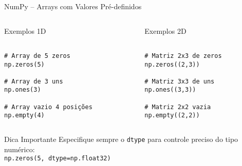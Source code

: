 \begin{frame}[fragile]{NumPy – Arrays com Valores Pré-definidos}
\begin{columns}[T]
    \begin{column}{0.5\textwidth}
        \begin{exampleblock}{Exemplos 1D}
\begin{verbatim}

# Array de 5 zeros
np.zeros(5)

# Array de 3 uns
np.ones(3)

# Array vazio 4 posições
np.empty(4)
\end{verbatim}
        \end{exampleblock}
    \end{column}
    
    \begin{column}{0.5\textwidth}
        \begin{exampleblock}{Exemplos 2D}
\begin{verbatim}

# Matriz 2x3 de zeros
np.zeros((2,3))

# Matriz 3x3 de uns
np.ones((3,3))

# Matriz 2x2 vazia
np.empty((2,2))
\end{verbatim}
        \end{exampleblock}
    \end{column}
\end{columns}

\begin{alertblock}{Dica Importante}
Especifique sempre o \texttt{dtype} para controle preciso do tipo numérico:\\
\texttt{np.zeros(5, dtype=np.float32)}
\end{alertblock}
\end{frame}

